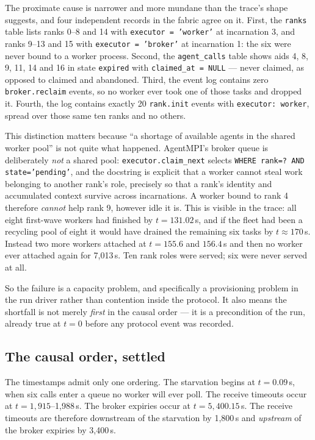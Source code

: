 \documentclass[11pt]{article}
\begin{document}
The proximate cause is narrower and more mundane than the trace's shape suggests, and
four independent records in the fabric agree on it. First, the \texttt{ranks} table lists
ranks 0--8 and 14 with \texttt{executor = 'worker'} at incarnation 3, and ranks 9--13 and
15 with \texttt{executor = 'broker'} at incarnation 1: the six were never bound to a
worker process. Second, the \texttt{agent\_calls} table shows aids 4, 8, 9, 11, 14 and 16
in state \texttt{expired} with \texttt{claimed\_at = NULL} --- never claimed, as opposed
to claimed and abandoned. Third, the event log contains zero \texttt{broker.reclaim}
events, so no worker ever took one of those tasks and dropped it. Fourth, the log
contains exactly 20 \texttt{rank.init} events with \texttt{executor: worker}, spread over
those same ten ranks and no others.

This distinction matters because ``a shortage of available agents in the shared worker
pool'' is not quite what happened. AgentMPI's broker queue is deliberately \emph{not} a
shared pool: \texttt{executor.claim\_next} selects \texttt{WHERE rank=? AND
state='pending'}, and the docstring is explicit that a worker cannot steal work belonging
to another rank's role, precisely so that a rank's identity and accumulated context
survive across incarnations. A worker bound to rank 4 therefore \emph{cannot} help rank
9, however idle it is. This is visible in the trace: all eight first-wave workers had
finished by $t=131.02$\,s, and if the fleet had been a recycling pool of eight it would
have drained the remaining six tasks by $t\approx170$\,s. Instead two more workers
attached at $t=155.6$ and $156.4$\,s and then no worker ever attached again for
7{,}013\,s. Ten rank roles were served; six were never served at all.

So the failure is a capacity problem, and specifically a provisioning problem in the run
driver rather than contention inside the protocol. It also means the shortfall is not
merely \emph{first} in the causal order --- it is a precondition of the run, already true
at $t=0$ before any protocol event was recorded.

\subsection{The causal order, settled}

The timestamps admit only one ordering. The starvation begins at $t=0.09$\,s, when six
calls enter a queue no worker will ever poll. The receive timeouts occur at
$t=1{,}915$--1{,}988\,s. The broker expiries occur at $t=5{,}400.15$\,s. The receive
timeouts are therefore downstream of the starvation by 1{,}800\,s and \emph{upstream} of
the broker expiries by 3{,}400\,s.
\end{document}
